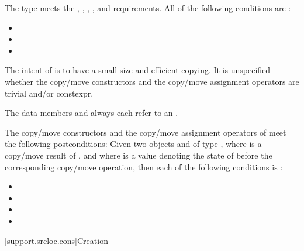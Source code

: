 \pnum
The type  meets the
,
,
,
, and
requirements.
All of the following conditions are :
\begin{itemize}
\item {}
\item {}
\item {}
\end{itemize}
\begin{note}
The intent of  is
to have a small size and efficient copying.
It is unspecified
whether the copy/move constructors and the copy/move assignment operators
are trivial and/or constexpr.
\end{note}

\pnum
The data members  and 
always each refer to an \ntbs{}.

\pnum
The copy/move constructors and the copy/move assignment operators of
 meet the following postconditions:
Given two objects   and  of type ,
where  is a copy/move result of , and
where  is a value denoting the state of 
before the corresponding copy/move operation,
then each of the following conditions is :
\begin{itemize}
\item {}
\item {}
\item {}
\item {}
\end{itemize}

[support.srcloc.cons]{Creation}

